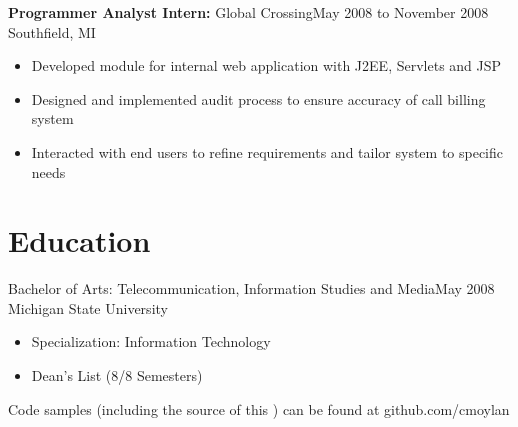 \documentclass[11pt]{res}
\begin{document}
\begin{resume}
{\bf Programmer Analyst Intern:} Global Crossing\dotfill May 2008 to November 2008\\
Southfield, MI
\begin{itemize}
\item Developed module for internal web application with J2EE, Servlets and JSP
\item Designed and implemented audit process to ensure accuracy of call billing system
\item Interacted with end users to refine requirements and tailor system to specific needs
\end{itemize}



\section{Education}
Bachelor of Arts: Telecommunication, Information Studies and Media\dotfill May 2008\\
Michigan State University
\begin{itemize}
\item Specialization: Information Technology
\item Dean's List (8/8 Semesters)
\end{itemize}





 \hoffset\centerline{\footnotesize Code samples (including the source of this \Resume) can be found at github.com/cmoylan}

\end{resume}
\end{document}
